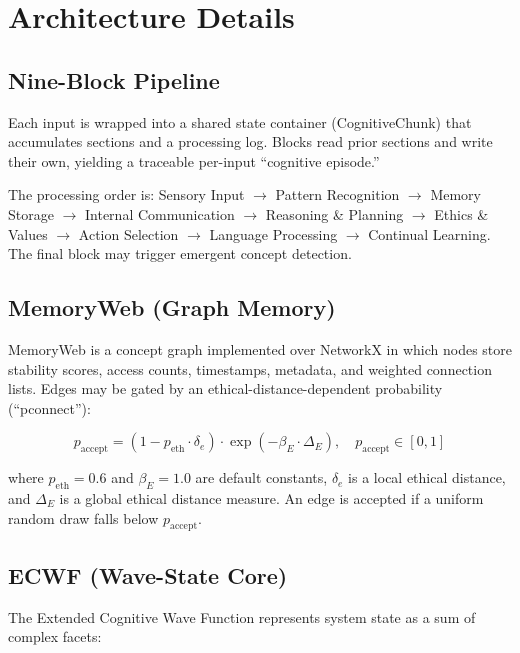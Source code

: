 \documentclass[11pt,a4paper]{article}
\begin{document}
\section{Architecture Details}

\subsection{Nine-Block Pipeline}

Each input is wrapped into a shared state container (CognitiveChunk) that 
accumulates sections and a processing log. Blocks read prior sections and 
write their own, yielding a traceable per-input ``cognitive episode.''

The processing order is: Sensory Input $\to$ Pattern Recognition $\to$ Memory 
Storage $\to$ Internal Communication $\to$ Reasoning \& Planning $\to$ Ethics 
\& Values $\to$ Action Selection $\to$ Language Processing $\to$ Continual 
Learning. The final block may trigger emergent concept detection.

\subsection{MemoryWeb (Graph Memory)}

MemoryWeb is a concept graph implemented over NetworkX in which nodes store 
stability scores, access counts, timestamps, metadata, and weighted connection 
lists. Edges may be gated by an ethical-distance-dependent probability 
(``pconnect''):

\begin{equation}
    p_{\text{accept}} = (1 - p_{\text{eth}} \cdot \delta_e) \cdot 
    \exp(-\beta_E \cdot \Delta_E), \quad 
    p_{\text{accept}} \in [0, 1]
    \label{eq:pconnect}
\end{equation}

\noindent where $p_{\text{eth}} = 0.6$ and $\beta_E = 1.0$ are default 
constants, $\delta_e$ is a local ethical distance, and $\Delta_E$ is a 
global ethical distance measure. An edge is accepted if a uniform random 
draw falls below $p_{\text{accept}}$.

\subsection{ECWF (Wave-State Core)}

The Extended Cognitive Wave Function represents system state as a sum of 
complex facets:
\end{document}
